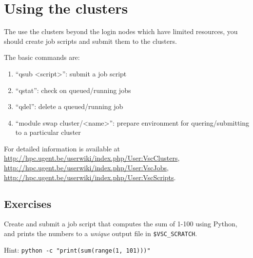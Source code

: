 \chapter{Using the clusters}

The use the clusters beyond the login nodes which have limited resources, you
should create job scripts and submit them to the clusters.

The basic commands are:

\begin{enumerate}
 \item``qsub <script>'': submit a job script
 \item``qstat'': check on queued/running jobs
 \item``qdel'': delete a queued/running job
 \item``module swap cluster/<name>'': prepare environment for quering/submitting to a particular cluster
\end{enumerate}

For detailed information is available at
\url{http://hpc.ugent.be/userwiki/index.php/User:VscClusters},
\url{http://hpc.ugent.be/userwiki/index.php/User:VscJobs},
\url{http://hpc.ugent.be/userwiki/index.php/User:VscScripts}.

\section{Exercises}

Create and submit a job script that computes the sum of 1-100 using Python, and
prints the numbers to a \emph{unique} output file in \verb|$VSC_SCRATCH|.

Hint: \verb|python -c "print(sum(range(1, 101)))"|
